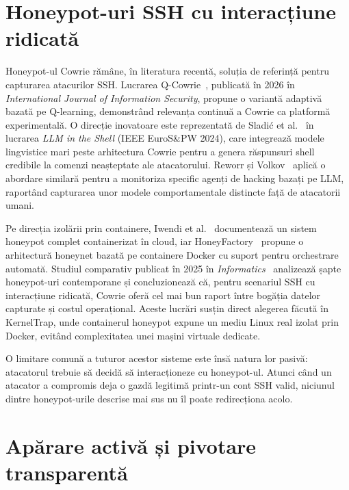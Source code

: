 \section{Honeypot-uri SSH cu interacțiune ridicată}

Honeypot-ul Cowrie rămâne, în literatura recentă, soluția de referință pentru
capturarea atacurilor SSH.
Lucrarea Q-Cowrie~\cite{qcowrie2026}, publicată în 2026 în
\textit{International Journal of Information Security}, propune o variantă
adaptivă bazată pe Q-learning, demonstrând relevanța continuă a Cowrie ca
platformă experimentală.
O direcție inovatoare este reprezentată de Sladić et al.~\cite{sladic2024llm}
în lucrarea \textit{LLM in the Shell} (IEEE EuroS\&PW 2024), care integrează
modele lingvistice mari peste arhitectura Cowrie pentru a genera răspunsuri
shell credibile la comenzi neașteptate ale atacatorului.
Reworr și Volkov~\cite{reworr2024llmhoneypot} aplică o abordare similară
pentru a monitoriza specific agenți de hacking bazați pe LLM, raportând
capturarea unor modele comportamentale distincte față de atacatorii umani.

Pe direcția izolării prin containere, Iwendi et al.~\cite{iwendi2023container}
documentează un sistem honeypot complet containerizat în cloud, iar
HoneyFactory~\cite{honeyfactory2024} propune o arhitectură honeynet bazată pe
containere Docker cu suport pentru orchestrare automată.
Studiul comparativ publicat în 2025 în
\textit{Informatics}~\cite{honeypotsurvey2025} analizează șapte honeypot-uri
contemporane și concluzionează că, pentru scenariul SSH cu interacțiune ridicată,
Cowrie oferă cel mai bun raport între bogăția datelor capturate și costul
operațional.
Aceste lucrări susțin direct alegerea făcută în KernelTrap, unde containerul
honeypot expune un mediu Linux real izolat prin Docker, evitând complexitatea
unei mașini virtuale dedicate.

O limitare comună a tuturor acestor sisteme este însă natura lor pasivă:
atacatorul trebuie să decidă să interacționeze cu honeypot-ul.
Atunci când un atacator a compromis deja o gazdă legitimă printr-un cont SSH
valid, niciunul dintre honeypot-urile descrise mai sus nu îl poate redirecționa
acolo.

\section{Apărare activă și pivotare transparentă}

